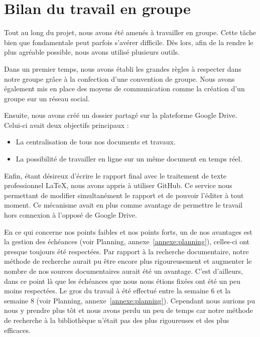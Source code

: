 \section{Bilan du travail en groupe}

Tout au long du projet, nous avons été amenés à travailler en groupe. Cette tâche bien que fondamentale peut parfois s'avérer difficile. Dès lors, afin de la rendre le plus agréable possible, nous avons utilisé plusieurs outils.

Dans un premier temps, nous avons établi les grandes règles à respecter dans notre groupe grâce à la confection d'une convention de groupe. Nous avons également mis en place des moyens de communication comme la création d'un groupe sur un réseau social.

Ensuite, nous avons créé un dossier partagé sur la plateforme Google Drive. Celui-ci avait deux objectifs principaux :
\begin{itemize}
\item La centralisation de tous nos documents et travaux.
\item La possibilité de travailler en ligne sur un même document en temps réel.
\end{itemize}

Enfin, étant désireux d'écrire le rapport final avec le traitement de texte professionnel \LaTeX, nous avons appris à utiliser GitHub. Ce service nous permettant de modifier simultanément le rapport et de pouvoir l'éditer à tout moment. Ce mécanisme avait en plus comme avantage de permettre le travail hors connexion à l'opposé de Google Drive.

En ce qui concerne nos points faibles et nos points forts, un de nos avantages est la gestion des échéances (voir Planning, annexe~\ref{annexe:planning}), celles-ci ont presque toujours été respectées. 
Par rapport à la recherche documentaire, notre méthode de recherche aurait pu être encore plus rigoureusement et augmenter le nombre de nos sources documentaires aurait été un avantage. C'est d'ailleurs, dans ce point là que les échéances que nous nous étions fixées ont été un peu moins respectées. Le gros du travail à été effectué entre la semaine 6 et la semaine 8 (voir Planning, annexe~\ref{annexe:planning}). Cependant nous aurions pu nous y prendre plus tôt et nous avons perdu un peu de temps car notre méthode de recherche à la bibliothèque n'était pas des plus rigoureuses et des plus efficaces.


